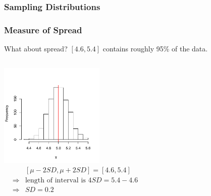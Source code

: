 \documentclass[handout]{beamer}
\newcommand{\blue}[1]{\textcolor{blue2}{#1}}
\newcommand{\xbar}{\overline{x}}
\begin{document}
\begin{frame}[fragile]
\frametitle{Sampling Distributions}

%
%
%

\end{frame}


\begin{frame}[fragile]
\frametitle{Measure of Spread}
What about spread?  $[4.6, 5.4]$ contains roughly 95\% of the data.

\begin{columns}[c]
\includegraphics[width=5cm]{figure/lec12-001}
\pause{}
\begin{eqnarray*}
&& [\mu - 2 SD, \mu + 2SD] = [4.6, 5.4]\\
&\Rightarrow& \mbox{length of interval is } 4SD = 5.4-4.6\\
&\Rightarrow& SD = 0.2
\end{eqnarray*}
\end{columns}




\end{frame}
\end{document}
